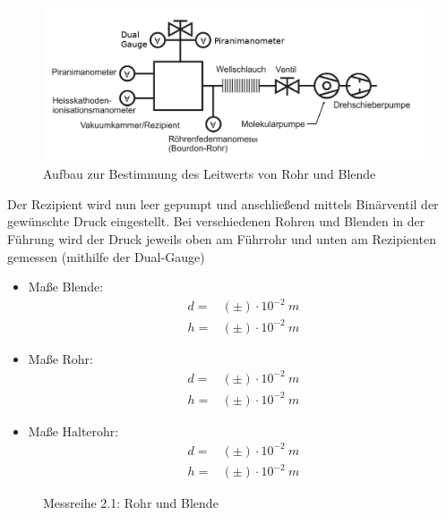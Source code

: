\documentclass[12pt, a4paper]{scrartcl}
\begin{document}
        \begin{figure}[H]
            \centering
            \includegraphics[width=.55\paperwidth]{aufbau24.png}
            \caption{Aufbau zur Bestimmung des Leitwerts von Rohr und Blende}
            \label{fig:anord5}
        \end{figure}
    
    	Der Rezipient wird nun leer gepumpt und anschließend mittels Binärventil der gewünschte Druck eingestellt. Bei verschiedenen Rohren und Blenden in der Führung wird der Druck jeweils oben am Führrohr und unten am Rezipienten gemessen (mithilfe der Dual-Gauge)
    	
    	\begin{itemize}
    		\item Maße Blende:
    			\begin{align*}
    				d=&(\pm)\cdot 10^{-2}\ m\\
    				h=&(\pm)\cdot 10^{-2}\ m
    			\end{align*}
    			
    		\item Maße Rohr:
    			\begin{align*}
    				d=&(\pm)\cdot 10^{-2}\ m\\
    				h=&(\pm)\cdot 10^{-2}\ m
    			\end{align*}
    			
    		\item Maße Halterohr:
    			\begin{align*}
    				d=&(\pm)\cdot 10^{-2}\ m\\
    				h=&(\pm)\cdot 10^{-2}\ m
    			\end{align*}
    	\end{itemize}
    
    	\begin{figure}[H]
    		\centering
    		\caption{Messreihe 2.1: Rohr und Blende}
   		\end{figure}
   	
\end{document}
